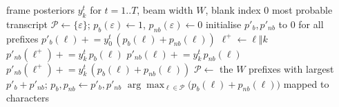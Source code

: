 \begin{algorithm}[H]
\caption{CTC prefix beam search for one utterance (probabilities in log space in practice).}
\label{alg:beam}
\begin{algorithmic}[1]
\Require frame posteriors $y^t_k$ for $t=1..T$, beam width $W$, blank index $0$
\Ensure most probable transcript
\State $\mathcal{P} \gets \{\varepsilon\}$; \quad $p_b(\varepsilon) \gets 1$, $p_{nb}(\varepsilon) \gets 0$
  \State initialise $p'_b, p'_{nb}$ to 0 for all prefixes
    \State $p'_b(\ell) \mathrel{+}= y^t_0\,(p_b(\ell)+p_{nb}(\ell))$ 
      \State $\ell^{+} \gets \ell \Vert k$
        \State $p'_{nb}(\ell^{+}) \mathrel{+}= y^t_k\,p_b(\ell)$ 
        \State $p'_{nb}(\ell) \mathrel{+}= y^t_k\,p_{nb}(\ell)$ 
      \Else
        \State $p'_{nb}(\ell^{+}) \mathrel{+}= y^t_k\,(p_b(\ell)+p_{nb}(\ell))$
      \EndIf
    \EndFor
  \EndFor
  \State $\mathcal{P} \gets$ the $W$ prefixes with largest $p'_b + p'_{nb}$; \quad $p_b, p_{nb} \gets p'_b, p'_{nb}$
\EndFor
\State \Return $\arg\max_{\ell\in\mathcal{P}} \big(p_b(\ell)+p_{nb}(\ell)\big)$ mapped to characters
\end{algorithmic}
\end{algorithm}
